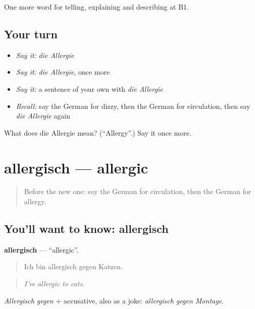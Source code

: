 \begin{grammarlens}[title={What you've built}]
One more word for telling, explaining and describing at B1.
\end{grammarlens}

\subsection*{Your turn}
\begin{itemize}
\raggedright
  \item \emph{Say it:} \emph{die Allergie}
  \item \emph{Say it:} \emph{die Allergie}, once more
  \item \emph{Say it:} a sentence of your own with \emph{die Allergie}
  \item \emph{Recall:} say the German for dizzy, then the German for circulation, then say \emph{die Allergie} again
\end{itemize}

\begin{tcolorbox}[breakable,colback=teal!4,colframe=teal!35!black,title={Before you move on}]
What does die Allergie mean? (\textquotedblleft{}Allergy\textquotedblright{}.) Say it once more.
\end{tcolorbox}
\section[allergisch]{allergisch — allergic}

\label{lesson:GE-C481-allergisch}



\begin{quote}
Before the new one: say the German for circulation, then the German for allergy.
\end{quote}

\subsection*{You'll want to know: allergisch}
\textbf{allergisch} — \textquotedblleft{}allergic\textquotedblright{}.

\begin{quote}
Ich bin allergisch gegen Katzen.
\end{quote}

\begin{quote}
\emph{I'm allergic to cats.}
\end{quote}

\emph{Allergisch gegen} + accusative, also as a joke: \emph{allergisch gegen Montage}.

